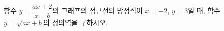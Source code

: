 \hspace*{2mm}\begin{minipage}[t]{\dimexpr\linewidth-2mm\relax}\vspace{0pt}
함수 $y=\dfrac{ax+2}{x-b}$의 그래프의 점근선의 방정식이 $x=-2$, $y=3$일 때, 함수 $y=\sqrt{ax+b}$의 정의역을 구하시오. \end{minipage}
